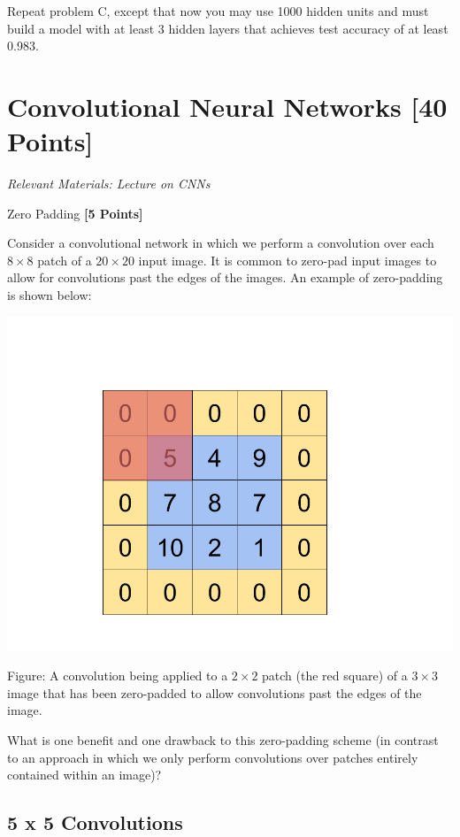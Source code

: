  Repeat problem C, except that now you may use 1000 hidden units and must build a model with at least 3 hidden layers that achieves test accuracy of at least 0.983.

  \begin{solution}

\end{solution}

 \newpage
 \section{Convolutional Neural Networks  [40 Points]}
 \textit{Relevant Materials: Lecture on CNNs}

 \problem Zero Padding \textbf{[5 Points]}

 Consider a convolutional network in which we perform a convolution over each $8 \times 8$ patch of a $20 \times 20$ input image. It is common to zero-pad input images to allow for convolutions past the edges of the images. An example of zero-padding is shown below:

\begin{center}
  \includegraphics[width=.49\textwidth]{Plots/ConvolutionExample.png}
\end{center}
\begin{small}
Figure: A convolution being applied to a $2 \times 2$ patch (the red square) of a $3 \times 3$ image that has been zero-padded to allow convolutions past the edges of the image.
\end{small}

What is one benefit and one drawback to this zero-padding scheme (in contrast to an approach in which we only perform convolutions over patches entirely contained within an image)?

\begin{solution}

\end{solution}

\subsection{5 x 5 Convolutions}

